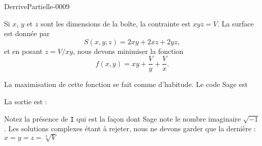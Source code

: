 
\begin{corrige}{DerrivePartielle-0009}

	Si $x$, $y$ et $z$ sont les dimensions de la boîte, la contrainte est $xyz=V$. La surface est donnée par
	\begin{equation}
		S(x,y,z)=2xy+2xz+2yz,
	\end{equation}
	et en posant $z=V/xy$, nous devons minimiser la fonction
	\begin{equation}
		f(x,y)=xy+\frac{ V }{ y }+\frac{ V }{ x }.
	\end{equation}
	
	La maximisation de cette fonction se fait comme d'habitude. Le code Sage est 


	La sortie est :


	Notez la présence de \verb+I+ qui est la façon dont Sage note le nombre imaginaire $\sqrt{-1}$. Les solutions complexes étant à rejeter, nous ne devons garder que la dernière :  $x=y=z=\sqrt[3]{V}$

\end{corrige}
